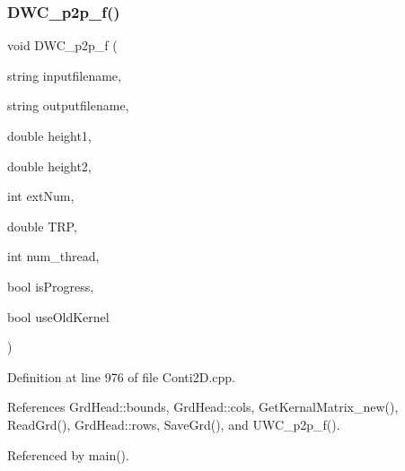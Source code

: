 \subsubsection{D\+W\+C\+\_\+p2p\+\_\+f()}
{\footnotesize\ttfamily void D\+W\+C\+\_\+p2p\+\_\+f (\begin{DoxyParamCaption}\item[{string}]{inputfilename,  }\item[{string}]{outputfilename,  }\item[{double}]{height1,  }\item[{double}]{height2,  }\item[{int}]{ext\+Num,  }\item[{double}]{T\+RP,  }\item[{int}]{num\+\_\+thread,  }\item[{bool}]{is\+Progress,  }\item[{bool}]{use\+Old\+Kernel }\end{DoxyParamCaption})}



Definition at line 976 of file Conti2\+D.\+cpp.



References Grd\+Head\+::bounds, Grd\+Head\+::cols, Get\+Kernal\+Matrix\+\_\+new(), Read\+Grd(), Grd\+Head\+::rows, Save\+Grd(), and U\+W\+C\+\_\+p2p\+\_\+f().



Referenced by main().

